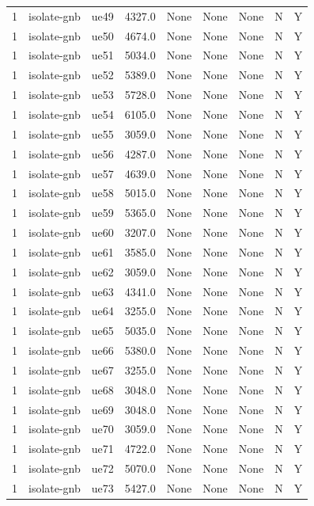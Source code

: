 \begin{table}[ht]
\begin{tabular}{|c|c|c|c|c|c|c|c|c|}
1 & isolate-gnb & ue49 & 4327.0 & None & None & None & N & Y \\
1 & isolate-gnb & ue50 & 4674.0 & None & None & None & N & Y \\
1 & isolate-gnb & ue51 & 5034.0 & None & None & None & N & Y \\
1 & isolate-gnb & ue52 & 5389.0 & None & None & None & N & Y \\
1 & isolate-gnb & ue53 & 5728.0 & None & None & None & N & Y \\
1 & isolate-gnb & ue54 & 6105.0 & None & None & None & N & Y \\
1 & isolate-gnb & ue55 & 3059.0 & None & None & None & N & Y \\
1 & isolate-gnb & ue56 & 4287.0 & None & None & None & N & Y \\
1 & isolate-gnb & ue57 & 4639.0 & None & None & None & N & Y \\
1 & isolate-gnb & ue58 & 5015.0 & None & None & None & N & Y \\
1 & isolate-gnb & ue59 & 5365.0 & None & None & None & N & Y \\
1 & isolate-gnb & ue60 & 3207.0 & None & None & None & N & Y \\
1 & isolate-gnb & ue61 & 3585.0 & None & None & None & N & Y \\
1 & isolate-gnb & ue62 & 3059.0 & None & None & None & N & Y \\
1 & isolate-gnb & ue63 & 4341.0 & None & None & None & N & Y \\
1 & isolate-gnb & ue64 & 3255.0 & None & None & None & N & Y \\
1 & isolate-gnb & ue65 & 5035.0 & None & None & None & N & Y \\
1 & isolate-gnb & ue66 & 5380.0 & None & None & None & N & Y \\
1 & isolate-gnb & ue67 & 3255.0 & None & None & None & N & Y \\
1 & isolate-gnb & ue68 & 3048.0 & None & None & None & N & Y \\
1 & isolate-gnb & ue69 & 3048.0 & None & None & None & N & Y \\
1 & isolate-gnb & ue70 & 3059.0 & None & None & None & N & Y \\
1 & isolate-gnb & ue71 & 4722.0 & None & None & None & N & Y \\
1 & isolate-gnb & ue72 & 5070.0 & None & None & None & N & Y \\
1 & isolate-gnb & ue73 & 5427.0 & None & None & None & N & Y \\

\end{tabular}
\end{table}
